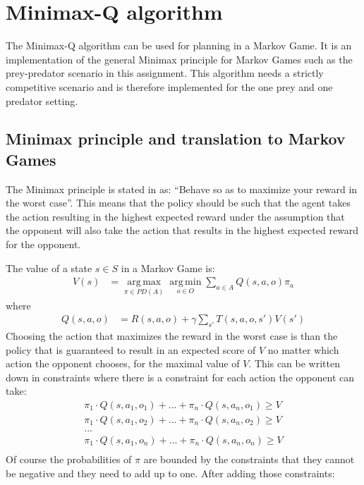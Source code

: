 
\section{Minimax-Q algorithm}
The Minimax-Q algorithm can be used for planning in a Markov Game. It is an implementation of the general Minimax principle for Markov Games such as the prey-predator scenario in this assignment. This algorithm needs a strictly competitive scenario and is therefore implemented for the one prey and one predator setting. 

\subsection{Minimax principle and translation to Markov Games}
The Minimax principle is stated in \cite{minimax} as: ``Behave so as to maximize your reward in the worst case''. This means that the policy should be such that the agent takes the action resulting in the highest expected reward under the assumption that the opponent will also take the action that results in the highest expected reward for the opponent.

\noindent The value of a state $s\in S$ in a Markov Game is:
\begin{align*}
V(s) &= \operatorname*{arg\,max}_{\pi \in PD(A)}
\operatorname*{arg\,min}_{o \in O}
\sum_{a \in A} Q(s,a,o) \pi_a
\end{align*}
where
\begin{align*}
Q(s,a,o) &= R(s,a,o) + \gamma \sum_{s'} T(s,a,o,s')V(s')
\end{align*}
Choosing the action that maximizes the reward in the worst case is than the policy that is guaranteed to result in an expected score of $V$ no matter which action the opponent chooses, for the maximal value of $V$. This can be written down in constraints where there is a constraint for each action the opponent can take:
%  
\begin{align*}
\pi_1 \cdot Q(s,a_1,o_1)+ ... + \pi_n \cdot Q(s,a_n,o_1) \geq V\\
\pi_1 \cdot Q(s,a_1,o_2)+ ... + \pi_n \cdot Q(s,a_n,o_2) \geq V\\
...\\
\pi_1 \cdot Q(s,a_1,o_n)+ ... + \pi_n \cdot Q(s,a_n,o_n) \geq V\\
\end{align*}
Of course the probabilities of $\pi$ are bounded by the constraints that they cannot be negative and they need to add up to one. After adding those constraints:

